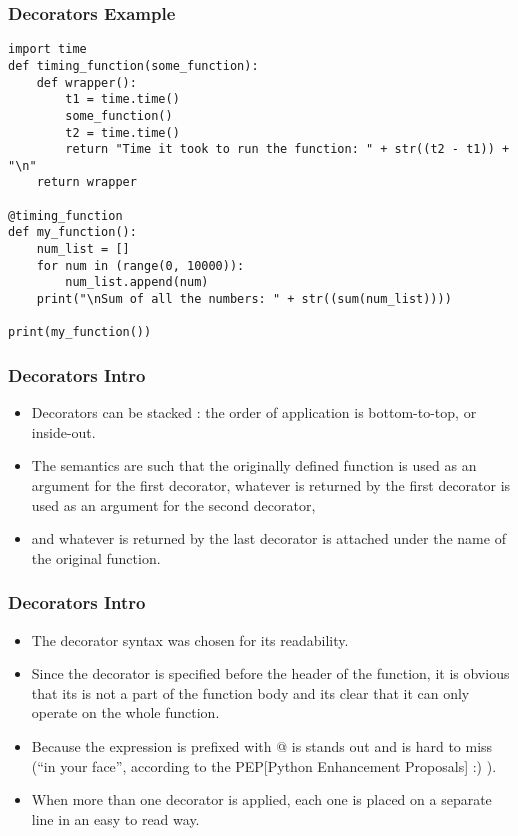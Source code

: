 \begin{frame}[fragile]\frametitle{Decorators Example}
        \begin{lstlisting}
import time
def timing_function(some_function):
    def wrapper():
        t1 = time.time()
        some_function()
        t2 = time.time()
        return "Time it took to run the function: " + str((t2 - t1)) + "\n"
    return wrapper

@timing_function
def my_function():
    num_list = []
    for num in (range(0, 10000)):
        num_list.append(num)
    print("\nSum of all the numbers: " + str((sum(num_list))))

print(my_function())
\end{lstlisting}
\end{frame}



\begin{frame}[fragile]\frametitle{Decorators Intro}
    \begin{itemize}
    \item Decorators can be stacked : the order of application is bottom-to-top, or inside-out. 
    \item The semantics are such that the originally defined function is used as an argument for the first decorator, whatever is returned by the first decorator is used as an argument for the second decorator,
    \item  and whatever is returned by the last decorator is attached under the name of the original function.
    \end{itemize}
\end{frame}

\begin{frame}[fragile]\frametitle{Decorators Intro}
    \begin{itemize}
    \item The decorator syntax was chosen for its readability. 
    \item Since the decorator is specified before the header of the function, it is obvious that its is not a part of the function body and its clear that it can only operate on the whole function. 		\item Because the expression is prefixed with @ is stands out and is hard to miss (``in your face'', according to the PEP[Python Enhancement Proposals] :) ). 
    \item When more than one decorator is applied, each one is placed on a separate line in an easy to read way.
    \end{itemize}
\end{frame}

